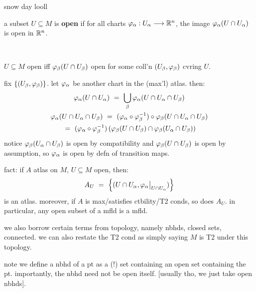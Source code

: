 snow day looll


\begin{defn}
	a subset $U\subseteq M$ is \textbf{open} if for all charts
	$\varphi_{\alpha}:U_{\alpha}\longrightarrow\mathbb{R}^{n}$, the image
	$\varphi_{\alpha}(U\cap U_{\alpha})$ is open in $\mathbb{R}^{n}$.
\end{defn} \

\begin{prop}
    $U\subseteq M$ open iff $\varphi_{\beta}(U\cap U_{\beta})$ open for
	some coll'n $(U_{\beta},\varphi_{\beta})$ cvring $U$.
\end{prop}

\newpage
\begin{pf}[source=Primary Source Material]
    fix $\left\{{(U_{\beta},\varphi_{\beta})}\right\}$.
	let $\varphi_{\alpha}$ be another chart in the (max'l) atlas.
	then:
	\begin{gather*}
		\vphi_{\alpha}(U\cap U_{\alpha}) \ = \ \bigcup_{\beta}\vphi_{\alpha}(U\cap U_{\alpha}\cap U_{\beta}) \\
		\vphi_{\alpha}(U\cap U_{\alpha}\cap U_{\beta})
		\ = \ (\vphi_{\alpha}\circ\vphi_{\beta}^{-1})\circ\vphi_{\beta}
		(U\cap U_{\alpha}\cap U_{\beta}) \\
		\ = \ (\vphi_{\alpha}\circ\vphi_{\beta}^{-1})
		\left(\vphi_{\beta}(U\cap U_{\beta})\cap
		\vphi_{\beta}(U_{\alpha}\cap U_{\beta})\right)
	\end{gather*}
	notice $\varphi_{\beta}(U_{\alpha}\cap U_{\beta})$ is open by compatibility
	and $\varphi_{\beta}(U\cap U_{\beta})$ is open by assumption,
	so $\varphi_{\alpha}$ is open by defn of transition maps.
\end{pf}

fact: if $A$ atlas on $M$, $U\subseteq M$ open, then:
\begin{equation*}
	A_{U} \ = \
	\left\{{(U\cap U_{\alpha}, \varphi_{\alpha}\big\rvert_{U\cap U_{\alpha}})}\right\}
\end{equation*}
is an atlas.
moreover, if $A$ is max/satisfies ctbility/T2 conds, so does $A_{U}$.
in particular, any open subset of a mfld is a mfld.

we also borrow certain terms from topology, namely
nbhds, closed sets, connected.
we can also restate the T2 cond as simply saying $M$ is T2 under this topology.

note we define a nbhd of a pt as a (!) set containing an open set containing
the pt. importantly, the nbhd need not be open itself.
[usually tho, we just take open nbhds].

